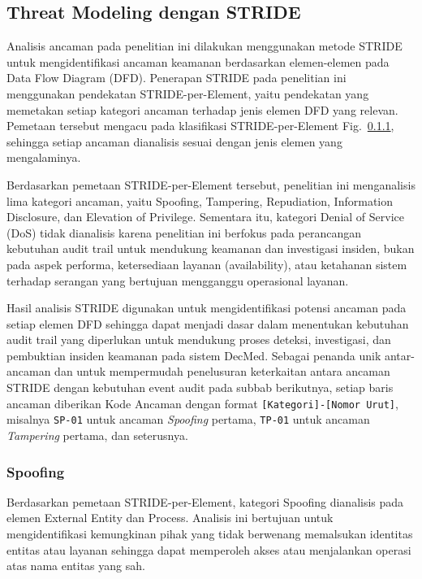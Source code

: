 \subsection{Threat Modeling dengan STRIDE}

Analisis ancaman pada penelitian ini dilakukan menggunakan metode STRIDE untuk mengidentifikasi ancaman keamanan berdasarkan elemen-elemen pada Data Flow Diagram (DFD). Penerapan STRIDE pada penelitian ini menggunakan pendekatan STRIDE-per-Element, yaitu pendekatan yang memetakan setiap kategori ancaman terhadap jenis elemen DFD yang relevan. Pemetaan tersebut mengacu pada klasifikasi STRIDE-per-Element Fig.~\ref{}, sehingga setiap ancaman dianalisis sesuai dengan jenis elemen yang mengalaminya.

Berdasarkan pemetaan STRIDE-per-Element tersebut, penelitian ini menganalisis lima kategori ancaman, yaitu Spoofing, Tampering, Repudiation, Information Disclosure, dan Elevation of Privilege. Sementara itu, kategori Denial of Service (DoS) tidak dianalisis karena penelitian ini berfokus pada perancangan kebutuhan audit trail untuk mendukung keamanan dan investigasi insiden, bukan pada aspek performa, ketersediaan layanan (availability), atau ketahanan sistem terhadap serangan yang bertujuan mengganggu operasional layanan.

Hasil analisis STRIDE digunakan untuk mengidentifikasi potensi ancaman pada setiap elemen DFD sehingga dapat menjadi dasar dalam menentukan kebutuhan audit trail yang diperlukan untuk mendukung proses deteksi, investigasi, dan pembuktian insiden keamanan pada sistem DecMed. Sebagai penanda unik antar-ancaman dan untuk mempermudah penelusuran keterkaitan antara ancaman STRIDE dengan kebutuhan event audit pada subbab berikutnya, setiap baris ancaman diberikan Kode Ancaman dengan format \texttt{[Kategori]-[Nomor Urut]}, misalnya \texttt{SP-01} untuk ancaman \textit{Spoofing} pertama, \texttt{TP-01} untuk ancaman \textit{Tampering} pertama, dan seterusnya.



\subsubsection{Spoofing}

Berdasarkan pemetaan STRIDE-per-Element, kategori Spoofing dianalisis pada elemen External Entity dan Process. Analisis ini bertujuan untuk mengidentifikasi kemungkinan pihak yang tidak berwenang memalsukan identitas entitas atau layanan sehingga dapat memperoleh akses atau menjalankan operasi atas nama entitas yang sah.

